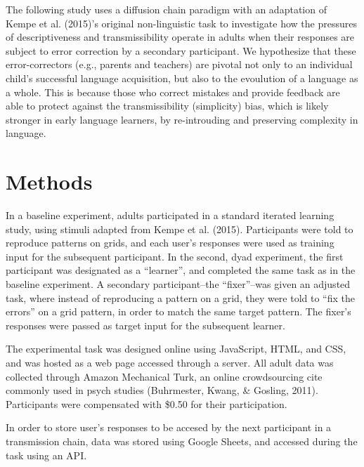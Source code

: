 \documentclass[10pt, letterpaper]{article}
\begin{document}
The following study uses a diffusion chain paradigm with an adaptation
of Kempe et al. (2015)'s original non-linguistic task to investigate how
the pressures of descriptiveness and transmissibility operate in adults
when their responses are subject to error correction by a secondary
participant. We hypothesize that these error-correctors (e.g., parents
and teachers) are pivotal not only to an individual child's successful
language acquisition, but also to the evoulution of a language as a
whole. This is because those who correct mistakes and provide feedback
are able to protect against the transmissibility (simplicity) bias,
which is likely stronger in early language learners, by re-introuding
and preserving complexity in language.

\section{Methods}\label{methods}

In a baseline experiment, adults participated in a standard iterated
learning study, using stimuli adapted from Kempe et al. (2015).
Participants were told to reproduce patterns on grids, and each user's
responses were used as training input for the subsequent participant. In
the second, dyad experiment, the first participant was designated as a
``learner'', and completed the same task as in the baseline experiment.
A secondary participant--the ``fixer''--was given an adjusted task,
where instead of reproducing a pattern on a grid, they were told to
``fix the errors'' on a grid pattern, in order to match the same target
pattern. The fixer's responses were passed as target input for the
subsequent learner.

The experimental task was designed online using JavaScript, HTML, and
CSS, and was hosted as a web page accessed through a server. All adult
data was collected through Amazon Mechanical Turk, an online
crowdsourcing cite commonly used in psych studies (Buhrmester, Kwang, \&
Gosling, 2011). Participants were compensated with \$0.50 for their
participation.

In order to store user's responses to be accesed by the next participant
in a transmission chain, data was stored using Google Sheets, and
accessed during the task using an API.
\end{document}
